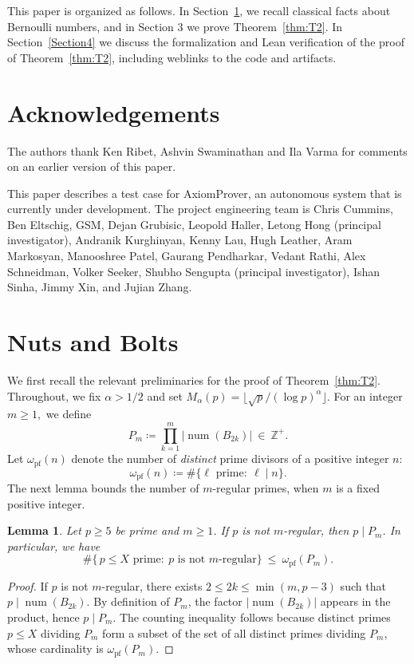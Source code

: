 \documentclass[12pt]{amsart}
\theoremstyle{plain}
\newtheorem{lemma}[theorem]{Lemma}
\theoremstyle{definition}
\newcommand{\ZZ}{\mathbb{Z}}
\DeclareMathOperator{\num}{num}
\newcommand{\omegapf}{\omega_{\mathrm{pf}}} %
\newif\ifmanyauthors
\begin{document}
\medskip

This paper is organized as follows.
In Section~\ref{Section2}, we recall  classical facts about Bernoulli numbers,
and in Section 3 we prove Theorem~\ref{thm:T2}.
In Section~\ref{Section4} we discuss the formalization and Lean verification of
the proof of Theorem~\ref{thm:T2}, including weblinks to the code and artifacts.


\section*{Acknowledgements}
The authors thank Ken Ribet, Ashvin Swaminathan and Ila Varma for comments on an
earlier version of this paper.
\ifmanyauthors
\else
This paper describes a test case for AxiomProver,
an autonomous system that is currently under development.
The project engineering team is
Chris Cummins,
Ben Eltschig,
GSM,
Dejan Grubisic,
Leopold Haller,
Letong Hong (principal investigator),
Andranik Kurghinyan,
Kenny Lau,
Hugh Leather,
Aram Markosyan,
Manooshree Patel,
Gaurang Pendharkar,
Vedant Rathi,
Alex Schneidman,
Volker Seeker,
Shubho Sengupta (principal investigator),
Ishan Sinha,
Jimmy Xin,
and Jujian Zhang.
\fi

\section{Nuts and Bolts}\label{Section2}

We first recall the relevant preliminaries for the proof of Theorem~\ref{thm:T2}.
Throughout, we fix $\alpha>1/2$ and set $M_{\alpha}(p)=\lfloor \sqrt{p}/(\log p)^{\alpha}\rfloor$.
For an integer $m\ge 1,$ we define
\begin{equation}\label{Pm}
P_m \coloneq \prod_{k=1}^{m} \bigl|\num(B_{2k})\bigr|\ \in\ \ZZ^{+}.
\end{equation}
Let $\omegapf(n)$ denote the number of \emph{distinct} prime divisors of a positive
integer $n$:
\[
\omegapf(n) \coloneq \#\{\ell \text{ prime}:\ \ell\mid n\}.
\]
The next lemma bounds the number of $m$-regular primes, when $m$ is a fixed positive integer.

\begin{lemma}\label{lem:primes-divide-product}
Let $p\ge 5$ be prime and $m\ge 1$.
If $p$ is not $m$-regular,
then $p\mid P_m$. In particular, we have
\[
\#\{\,p\le X\text{ prime}:\ p\text{ is not $m$-regular}\}\ \le\ \omegapf(P_m).
\]
\end{lemma}

\begin{proof}
If $p$ is not $m$-regular, there exists $2\le 2k\le \min(m,p-3)$ such that
$p\mid \num(B_{2k})$. By definition of $P_m$, the factor $|\num(B_{2k})|$ appears in
the product, hence $p\mid P_m$. The counting inequality follows because distinct
primes $p\le X$ dividing $P_m$ form a subset of the set of all distinct primes
dividing $P_m$, whose cardinality is $\omegapf(P_m)$.
\end{proof}
\end{document}
